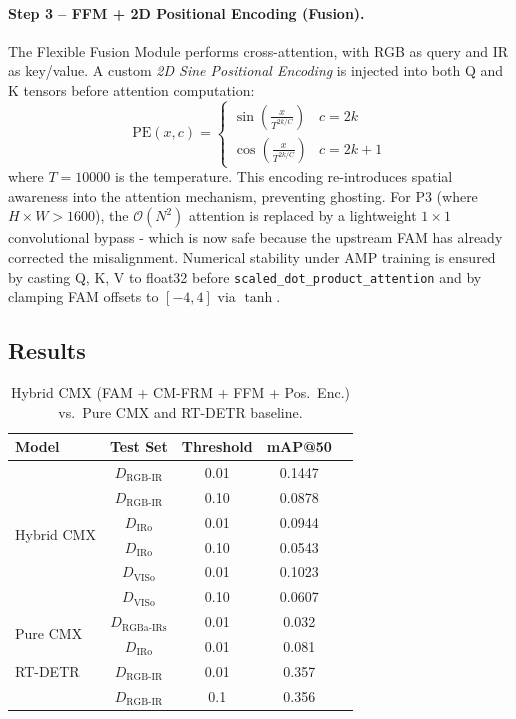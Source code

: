 \documentclass[12pt, a4paper]{article}
\begin{document}
\paragraph{Step 3 -- FFM + 2D Positional Encoding (Fusion).} The Flexible Fusion Module performs cross-attention, with RGB as query and IR as key/value. A custom \textit{2D Sine Positional Encoding} is injected into both Q and K tensors before attention computation:
\begin{equation}
    \text{PE}(x, c) = \begin{cases} \sin\!\left(\frac{x}{T^{2k/C}}\right) & c = 2k \\ \cos\!\left(\frac{x}{T^{2k/C}}\right) & c = 2k+1 \end{cases}
\end{equation}
where $T=10000$ is the temperature. This encoding re-introduces spatial awareness into the attention mechanism, preventing ghosting. For P3 (where $H \times W > 1600$), the $\mathcal{O}(N^2)$ attention is replaced by a lightweight $1\times1$ convolutional bypass - which is now safe because the upstream FAM has already corrected the misalignment. Numerical stability under AMP training is ensured by casting Q, K, V to float32 before \texttt{scaled\_dot\_product\_attention} and by clamping FAM offsets to $[-4, 4]$ via $\tanh$.

\subsection{Results}

\begin{table}[h]
\centering
\caption{Hybrid CMX (FAM + CM-FRM + FFM + Pos.\ Enc.) vs.\ Pure CMX and RT-DETR baseline.}
\label{tab:hybrid_cmx}
\begin{tabular}{lcccc}
\toprule
\textbf{Model} & \textbf{Test Set} & \textbf{Threshold} & \textbf{mAP@50} \\
\midrule
\multirow{6}{*}{Hybrid CMX} & $D_{\text{RGB-IR}}$ & 0.01 & 0.1447 \\
                             & $D_{\text{RGB-IR}}$ & 0.10 & 0.0878 \\
                             & $D_{\text{IRo}}$      & 0.01 & 0.0944 \\
                             & $D_{\text{IRo}}$      & 0.10 & 0.0543 \\
                             & $D_{\text{VISo}}$     & 0.01 & 0.1023 \\
                             & $D_{\text{VISo}}$     & 0.10 & 0.0607 \\
\midrule
\multirow{2}{*}{Pure CMX}   & $D_{\text{RGBa-IRs}}$ & 0.01 & 0.032 \\
                             & $D_{\text{IRo}}$      & 0.01 & 0.081 \\
\midrule
RT-DETR            & $D_{\text{RGB-IR}}$ & 0.01 & 0.357 \\
                    & $D_{\text{RGB-IR}}$ & 0.1 & 0.356 \\
\bottomrule
\end{tabular}
\end{table}
\end{document}
